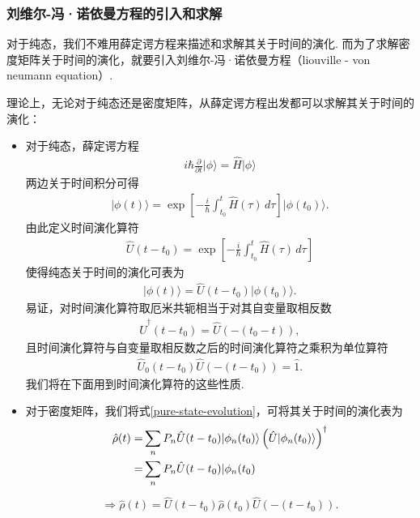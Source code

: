 \documentclass{assignment}
\begin{document}
\subsubsection{刘维尔-冯·诺依曼方程的引入和求解}
对于纯态，我们不难用薛定谔方程来描述和求解其关于时间的演化. 而为了求解密度矩阵关于时间的演化，就要引入刘维尔-冯·诺依曼方程（liouville - von neumann equation）.

理论上，无论对于纯态还是密度矩阵，从薛定谔方程出发都可以求解其关于时间的演化：
\begin{itemize}
    \item 对于纯态，薛定谔方程
    \begin{align}
        i\hbar\frac{\partial}{\partial t}\lvert\phi\rangle=\hat{H}\lvert\phi\rangle
    \end{align}
    两边关于时间积分可得
    \begin{align}
        \lvert\phi(t)\rangle=\exp\left[-\frac{i}{\hbar}\int_{t_0}^t\hat{H}(\tau)\,d\tau\right]\lvert\phi(t_0)\rangle.
    \end{align}
    由此定义时间演化算符
    \begin{align}
        \hat{U}(t-t_0)=\exp\left[-\frac{i}{\hbar}\int_{t_0}^t\hat{H}(\tau)\,d\tau\right]
    \end{align}
    使得纯态关于时间的演化可表为
    \begin{align}
        \label{pure-state-evolution}
        \boxed{\lvert\phi(t)\rangle=\hat{U}(t-t_0)\lvert\phi(t_0)\rangle.}
    \end{align}
    易证，对时间演化算符取厄米共轭相当于对其自变量取相反数
    \begin{align}
        \hat{U}^{\dagger}(t-t_0)=\hat{U}(-(t_0-t)),
    \end{align}
    且时间演化算符与自变量取相反数之后的时间演化算符之乘积为单位算符
    \begin{align}
        \hat{U}_0(t-t_0)\hat{U}(-(t-t_0))=\hat{1}.
    \end{align}
    我们将在下面用到时间演化算符的这些性质.
    \item 对于密度矩阵，我们将式\eqref{pure-state-evolution}，可将其关于时间的演化表为
    \begin{align}
        \notag\hat{\rho}(t)=&\sum_nP_n\hat{U}(t-t_0)\lvert\phi_n(t_0)\rangle\left(\hat{U}\lvert\phi_n(t_0)\rangle\right)^{\dagger}\\
        \notag=&\sum_nP_n\hat{U}(t-t_0)\lvert\phi_n(t_0)
    \end{align}
    \begin{align}
        \label{mixture-state-evolution}
        \Longrightarrow\boxed{\hat{\rho}(t)=\hat{U}(t-t_0)\hat{\rho}(t_0)\hat{U}(-(t-t_0)).}
    \end{align}
\end{itemize}
\end{document}
